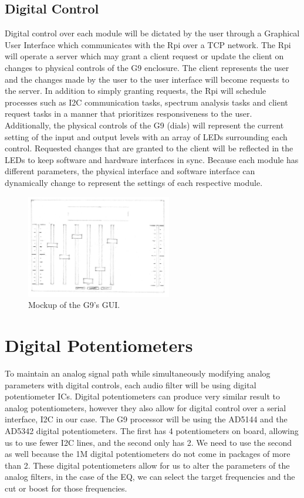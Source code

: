 \documentclass[journal]{IEEEtran}
\begin{document}
	
	
	\subsection{Digital Control}
	Digital control over each module will be dictated by the user through a Graphical User Interface which communicates with the Rpi over a TCP network.  The Rpi will operate a server which may grant a client request or update the client on changes to physical controls of the G9 enclosure.  The client represents the user and the changes made by the user to the user interface will become requests to the server.  In addition to simply granting requests, the Rpi will schedule processes such as I2C communication tasks, spectrum analysis tasks and client request tasks in a manner that prioritizes responsiveness to the user.  Additionally, the physical controls of the G9 (dials) will represent the current setting of the input and output levels with an array of LEDs surrounding each control.  Requested changes that are granted to the client will be reflected in the LEDs to keep software and hardware interfaces in sync.  Because each module has different parameters, the physical interface and software interface can dynamically change to represent the settings of each respective module.
	
	
	
	\begin{figure}
		\centering
		\includegraphics[width=2.5in]{gui}
		\caption{Mockup of the G9's GUI. }
		\label{fig:gui}
	\end{figure}
	
	
	\section{Digital Potentiometers}
	To maintain an analog signal path while simultaneously modifying analog parameters with digital controls, each audio filter will be using digital potentiometer ICs.  Digital potentiometers can produce very similar result to analog potentiometers, however they also allow for digital control over a serial interface, I2C in our case.  The G9 processor will be using the AD5144 and the AD5342 digital potentiometers.  The first has 4 potentiometers on board, allowing us to use fewer I2C lines, and the second only has 2.  We need to use the second as well because the 1M digital potentiometers do not come in packages of more than 2. These digital potentiometers allow for us to alter the parameters of the analog filters, in the case of the EQ, we can select the target frequencies and the cut or boost for those frequencies.
	
\end{document}
